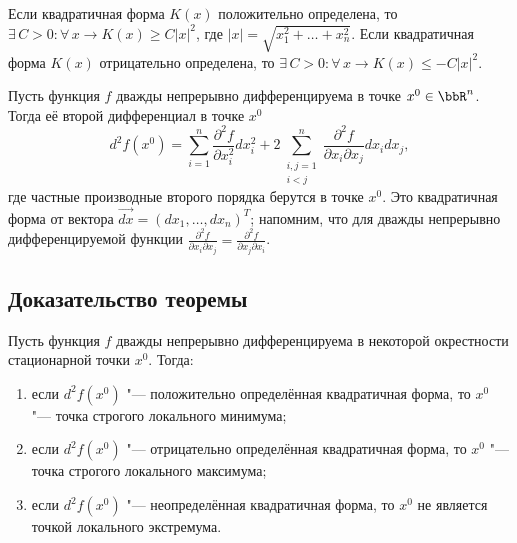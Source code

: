 
\begin{lemm} \label{lm18:4}
Если квадратичная форма $K(x)$ положительно определена, то $\exists\, C > 0 \colon \forall\, x \longrightarrow K(x) \ge C|x|^2$, где $|x| = \sqrt{x_1^2 + \ldots + x_n^2}$. Если квадратичная форма $K(x)$ отрицательно определена, то $\exists\, C > 0 \colon \forall\, x \longrightarrow K(x) \le -C|x|^2$.
\end{lemm}

Пусть функция $f$ дважды непрерывно дифференцируема в точке $x^0 \in \bbR^n$. Тогда её второй дифференциал в точке $x^0$
$$
d^2f(x^0) = \sum_{i=1}^n \frac{\partial^2 f}{\partial x_i^2} dx_i^2 + 2\sum_{\substack{i,j=1 \\ i<j}}^n \frac{\partial^2 f}{\partial x_i \partial x_j} dx_i dx_j,
$$
где частные производные второго порядка берутся в точке $x^0$. Это квадратичная форма от вектора $\overrightarrow{dx} = (dx_1, \ldots, dx_n)^T$; напомним, что для дважды непрерывно дифференцируемой функции $\frac{\partial^2 f}{\partial x_i \partial x_j} = \frac{\partial^2 f}{\partial x_j \partial x_i}$.

\subsection{Доказательство теоремы}

\begin{thm} \label{th18:6}
Пусть функция $f$ дважды непрерывно дифференцируема в некоторой окрестности стационарной точки $x^0$. Тогда:
\begin{enumerate}
    \item[1)] если $d^2f(x^0)$ "--- положительно определённая квадратичная форма, то $x^0$ "--- точка строгого локального минимума;
    \item[2)] если $d^2f(x^0)$ "--- отрицательно определённая квадратичная форма, то $x^0$ "--- точка строгого локального максимума;
    \item[3)] если $d^2f(x^0)$ "--- неопределённая квадратичная форма, то $x^0$ не является точкой локального экстремума.
\end{enumerate}
\end{thm}

